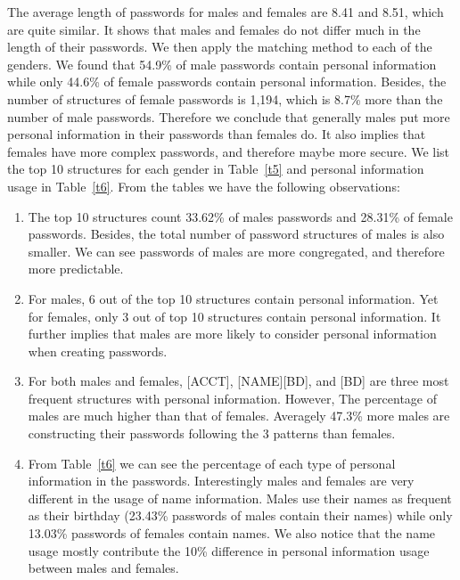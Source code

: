\documentclass{sig-alternate}
\begin{document}
The average length of passwords for males and females are 8.41 and 8.51, which are quite similar. It shows that males and females do not differ much in the length of their passwords. We then apply the matching method to each of the genders. We found that 54.9\% of male passwords contain personal information while only 44.6\% of female passwords contain personal information. Besides, the number of structures of female passwords is 1,194, which is 8.7\% more than the number of male passwords. Therefore we conclude that generally males put more personal information in their passwords than females do. It also implies that females have more complex passwords, and therefore maybe more secure. We list the top 10 structures for each gender in Table~\ref{t5} and personal information usage in Table~\ref{t6}. From the tables we have the following observations:
\begin{enumerate}[leftmargin=*]
\item The top 10 structures count 33.62\% of males passwords and 28.31\% of female passwords. Besides, the total number of password structures of males is also smaller. We can see passwords of males are more congregated, and therefore more predictable. 
\item For males, 6 out of the top 10 structures contain personal information. Yet for females, only 3 out of top 10 structures contain personal information. It further implies that males are more likely to consider personal information when creating passwords.
\item For both males and females, [ACCT], [NAME][BD], and [BD] are three most frequent structures with personal information. However, The percentage of males are much higher than that of females. Averagely 47.3\% more males are constructing their passwords following the 3 patterns than females.
\item From Table~\ref{t6} we can see the percentage of each type of personal information in the passwords. Interestingly males and females are very different in the usage of name information. Males use their names as frequent as their birthday (23.43\% passwords of males contain their names) while only 13.03\% passwords of females contain names. We also notice that the name usage mostly contribute the 10\% difference in personal information usage between males and females. 
\end{enumerate} 
\end{document}
